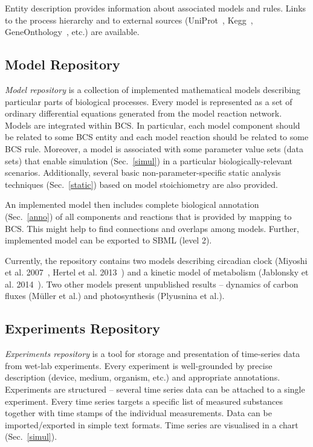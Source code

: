 \documentclass[runningheads]{llncs}
\begin{document}
Entity description provides information about associated models and rules. Links to the process hierarchy and to external sources (UniProt~\cite{TheUniProtConsortium28012015}, Kegg~\cite{Kanehisa04012016}, GeneOnthology~\cite{go}, etc.) are available.

\subsection{Model Repository}
\label{model}
\enlargethispage*{6mm}

\emph{Model repository} is a collection of implemented mathematical models describing particular parts of biological processes. Every model is represented as a set of ordinary differential equations generated from the model reaction network. Models are integrated within BCS. In particular, each model component should be related to some BCS entity and each model reaction should be related to some BCS rule. Moreover, a model is associated with some parameter value sets (data sets) that enable simulation (Sec.~\ref{simul}) in a particular biologically-relevant scenarios. Additionally, several basic non-parameter-specific static analysis techniques (Sec.~\ref{static}) based on model stoichiometry are also provided.

An implemented model then includes complete biological annotation (Sec.~\ref{anno}) of all components and reactions that is provided by mapping to BCS. This might help to find connections and overlaps among models. Further, implemented model can be exported to SBML (level 2).

Currently, the repository contains two models describing circadian clock (Miyoshi et al. 2007~\cite{Miyoshi01022007}, Hertel et al. 2013~\cite{Hertel2013}) and a kinetic model of metabolism (Jablonsky et al. 2014~\cite{Jablonsky2014}). Two other models present unpublished results -- dynamics of carbon fluxes (M\"{u}ller et al.) and photosynthesis (Plyusnina et al.).

\subsection{Experiments Repository}
\emph{Experiments repository} is a tool for storage and presentation of time-series data from wet-lab experiments. Every experiment is well-grounded by precise description (device, medium, organism, etc.) and appropriate annotations. Experiments are structured -- several time series data can be attached to a single experiment. Every time series targets a specific list of measured substances together with time stamps of the individual measurements. Data can be imported/exported in simple text formats. Time series are visualised in a chart (Sec.~\ref{simul}).
\end{document}
